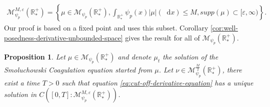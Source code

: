\documentclass[11pt,a4paper]{article}
\newcommand{\RRP}{\mathbb{R}^+_*}
\newcommand{\MC}{\mathcal{M}}
\newcommand{\dd}{\mathop{}\!\mathrm{d}}
\newtheorem{proposition}[theorem]{Proposition}
\begin{document}
\begin{align*}
    \MC^{M,\varepsilon}_{\psi_p}\left(\RRP\right) = \left\lbrace \mu \in \MC_{\psi_p}\left(\RRP\right), \int_{\RRP} \psi_p(x)|\mu|(\dd x) \leq M, supp(\mu) \subset [\varepsilon,\infty) \right\rbrace.
\end{align*}
Our proof is based on a fixed point and uses this subset. Corollary \ref{cor:well-posedness-derivative-unbounded-space} gives the result for all of $\MC_{\psi_p}\left(\RRP\right)$.
\begin{proposition}\label{prop:well-posedness-derivative-cutoff-bounded}
    Let $\mu \in \MC_{\psi_p}\left(\RRP\right) $ and denote $\mu_t$ the solution of the Smoluchowski Coagulation equation started from $\mu$. Let $\nu \in \MC^{\frac{M}{2}}_{\psi_p}\left(\RRP\right)$, there exist a time $T> 0$ such that equation \eqref{eq:cut-off-derivative-equation} has a unique solution in $C\left([0,T]:\MC^{M,\varepsilon}_{\psi_p}\left(\RRP\right) \right)$.
\end{proposition}
\end{document}
